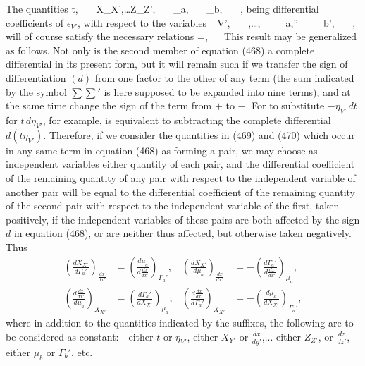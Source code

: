 \documentclass[12pt]{memoir}
\begin{document}
{The quantities
\eqs t, \ \ \ X_{X'},\dots Z_{Z'}, \ \ \ \mu_a, \ \ \ \mu_b, \ \ \ ,       \label{469} \eqe
being differential coefficients of $\epsilon_{V'}$, with respect to the variables
\eqs \eta_{V'}, \ \ \ ,\dots {}, \ \ \ \Gamma_a,'' \ \ \ \Gamma_b', \ \ \ , \label{470} \eqe
will of course satisfy the necessary relations
\eqs {}=, \ \          \label{471} \eqe
This result may be generalized as follows. Not only is the second member of equation (468) a complete differential in its present form, but it will remain such if we transfer the sign of differentiation $(d)$ from one factor to the other of any term (the sum indicated by the
symbol $\sum\sum\nolimits'$ is here supposed to be expanded into nine terms), and at the same time change the sign of the term from $+$ to $-$. For to substitute $-\eta_{V'} \,dt$ for $t\,d\eta_{V'}$, for example, is equivalent to subtracting the complete differential $d(t\eta_{V'})$. Therefore, if we consider the quantities in (469) and (470) which occur in any same term in equation (468) as forming a pair, we may choose as independent variables either quantity of each pair, and the differential coefficient of the remaining quantity of any pair with respect to the independent variable of another pair will be equal to the differential coefficient of the remaining quantity of the second pair with respect to the independent variable of the first, taken positively, if the independent variables of these pairs are both affected by the sign $d$ in equation (468), or are neither thus affected, but otherwise taken negatively. Thus
\begin{align}
\left( \frac{dX_{X'}}{d\Gamma_a'}\right)_{\frac{dx}{dx'}} &=   \left(\frac{d\mu_a}{d\frac{dx}{dx'}} \right)_{\Gamma_a'},     &
\left( \frac{dX_{X'}}{d\mu_a}\right)_{\frac{dx}{dx'}} &=  - \left(\frac{d\Gamma_a'}{d\frac{dx}{dx'}} \right)_{\mu_a},    \label{472} \\
\left( \frac{d\frac{dx}{dx'}}{d\mu_a}\right)_{X_{X'}} &=   \left(\frac{d\Gamma_a'}{d X_{X'}} \right)_{\mu_a},     &
\left( \frac{d\frac{dx}{dx'}}{d\Gamma_a'}\right)_{X_{X'}} &=  -\left(\frac{d\mu_a}{d X_{X'}} \right)_{\Gamma_a'},   \label{473}
\end{align}
where in addition to the quantities indicated by the suffixes, the following are to be considered as constant:---either $t$ or $\eta_{V'}$, either $X_{Y'}$ or $\frac{dx}{dy'}$,... either $Z_{Z'}$, or $\frac{dz}{dz'}$, either $\mu_b$ or $\Gamma_b'$, etc.


}
\end{document}
